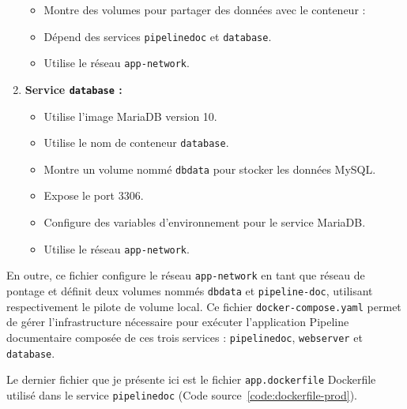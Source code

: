 \begin{enumerate}
\begin{itemize}
              \item Montre des volumes pour partager des données avec le conteneur :
              \item Dépend des services \Verb|pipelinedoc| et \Verb|database|.
              \item Utilise le réseau \Verb|app-network|.
          \end{itemize}
    \item \cprotect\textbf{Service \Verb|database| :}
          \begin{itemize}
              \item Utilise l'image MariaDB version 10.
              \item Utilise le nom de conteneur \Verb|database|.
              \item Montre un volume nommé \Verb|dbdata| pour stocker les données MySQL.
              \item Expose le port 3306.
              \item Configure des variables d'environnement pour le service MariaDB.
              \item Utilise le réseau \Verb|app-network|.
          \end{itemize}
\end{enumerate}

En outre, ce fichier configure le réseau \Verb|app-network| en tant que réseau de pontage et définit deux volumes nommés \Verb|dbdata| et \Verb|pipeline-doc|, utilisant respectivement le pilote de volume local. Ce fichier \Verb|docker-compose.yaml| permet de gérer l'infrastructure nécessaire pour exécuter l'application Pipeline documentaire composée de ces trois services : \Verb|pipelinedoc|, \Verb|webserver| et \Verb|database|.

Le dernier fichier que je présente ici est le fichier \Verb|app.dockerfile| Dockerfile utilisé dans le service \Verb|pipelinedoc| (Code source~\ref{code:dockerfile-prod}).

